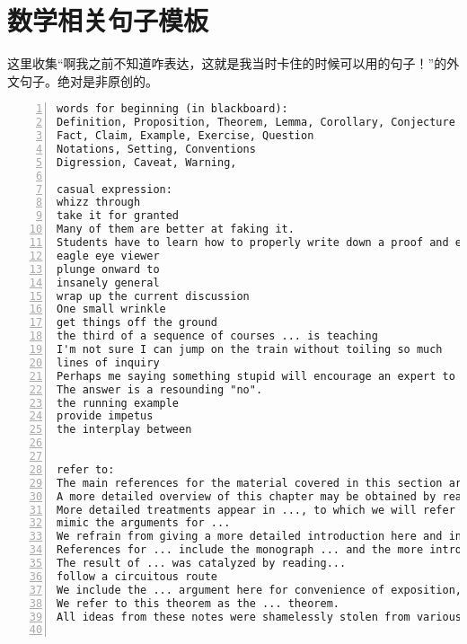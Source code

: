 \documentclass[11pt]{amsart}
\begin{document}
\section{数学相关句子模板}
这里收集“啊我之前不知道咋表达，这就是我当时卡住的时候可以用的句子！”的外文句子。绝对是非原创的。
\begin{lstlisting}[numbers=left,numberstyle=\tiny,numbersep=10pt]
words for beginning (in blackboard):
Definition, Proposition, Theorem, Lemma, Corollary, Conjecture
Fact, Claim, Example, Exercise, Question
Notations, Setting, Conventions
Digression, Caveat, Warning,

casual expression:
whizz through
take it for granted
Many of them are better at faking it.
Students have to learn how to properly write down a proof and everything. So one has to do important pedagogical work and teach them, how to do this.
eagle eye viewer
plunge onward to
insanely general
wrap up the current discussion
One small wrinkle
get things off the ground
the third of a sequence of courses ... is teaching
I'm not sure I can jump on the train without toiling so much
lines of inquiry
Perhaps me saying something stupid will encourage an expert to weigh in
The answer is a resounding "no".
the running example
provide impetus
the interplay between


refer to:
The main references for the material covered in this section are ...
A more detailed overview of this chapter may be obtained by reading the introductions to the various sections.
More detailed treatments appear in ..., to which we will refer for proofs.
mimic the arguments for ...
We refrain from giving a more detailed introduction here and instead refer the reader to the table of contents as well as to the short introductions of the individual sections.
References for ... include the monograph ... and the more introductory account ...
The result of ... was catalyzed by reading...
follow a circuitous route
We include the ... argument here for convenience of exposition, and because the comparison with their constructions is interesting in its own right.
We refer to this theorem as the ... theorem.
All ideas from these notes were shamelessly stolen from various lecture notes in the literature. I mention a few:


\end{lstlisting}
\end{document}
